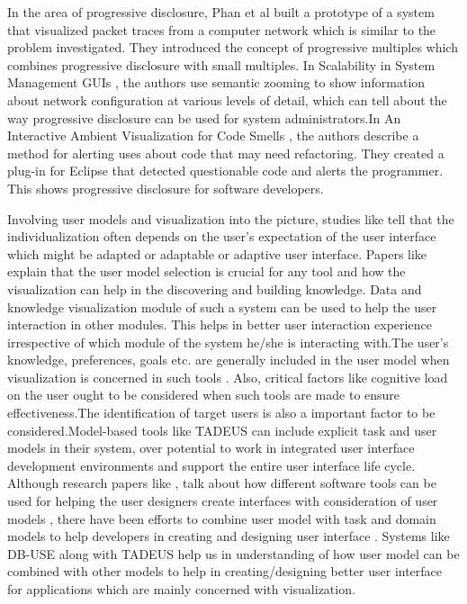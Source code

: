 \documentclass{sig-alternate}
\begin{document}
In the area of progressive disclosure, Phan et al built a prototype of a system
that visualized packet traces from a computer network \cite{Phan:07} which is similar to
the problem investigated. They introduced the concept of progressive multiples
which combines progressive disclosure with small multiples. In Scalability in
System Management GUIs \cite{Dieberger:06}, the authors use semantic zooming to show information
about network configuration at various levels of detail, which can tell about
the way progressive disclosure can be used for system administrators.In An
Interactive Ambient Visualization for Code Smells \cite{Murphy:10}, the authors describe a
method for alerting uses about code that may need refactoring. They created a
plug-in for Eclipse that detected questionable code and alerts the programmer.
This shows progressive disclosure for software developers.

Involving user models and visualization into the picture, studies like \cite{Schlungbaum:97} tell
that the individualization often depends on the user's expectation of the user
interface which might be adapted or adaptable or adaptive user interface. Papers
like \cite{Ho:01} explain that the user model selection is crucial for any tool and how
the visualization can help in the discovering and building knowledge. Data and
knowledge visualization module of such a system can be used to help the user
interaction in other modules. This helps in better user interaction experience
irrespective of which module of the system he/she is interacting with.The user's
knowledge, preferences, goals etc. are generally included in the user model when
visualization is concerned in such tools \cite{Henderson}. Also, critical factors like cognitive
load on the user ought to be considered when such tools are made to ensure
effectiveness.The identification of target users is also a important factor to be
considered.Model-based tools like TADEUS can include explicit task and user models
in their system, over potential to work in integrated user interface development
environments and support the entire user interface life cycle. Although research
papers like \cite{Schlungbaum:97}, talk about how different software tools can be used for helping
the user designers create interfaces with consideration of user models , there have
been efforts to combine user model with task and domain models to help developers
in creating and designing user interface \cite{Tran:10}. Systems like DB-USE along with TADEUS
help us in understanding of how user model can be combined with other models to help
in creating/designing better user interface for applications which are mainly
concerned with visualization.
\end{document}
